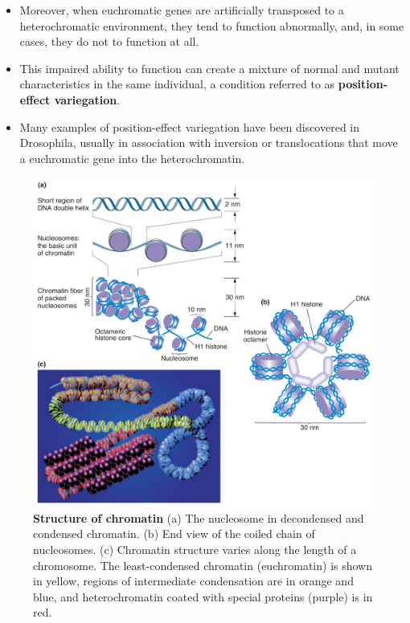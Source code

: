 \documentclass[11pt,dvipsnames,ignorenonframetext,aspectratio=169]{beamer}
\providecommand{\tightlist}{%
  \setlength{\itemsep}{0pt}\setlength{\parskip}{0pt}}
\begin{document}
\begin{frame}{}
\protect\hypertarget{section-6}{}
\begin{itemize}
\tightlist
\item
  Moreover, when euchromatic genes are artificially transposed to a
  heterochromatic environment, they tend to function abnormally, and, in
  some cases, they do not to function at all.
\item
  This impaired ability to function can create a mixture of normal and
  mutant characteristics in the same individual, a condition referred to
  as \textbf{position-effect variegation}.
\item
  Many examples of position-effect variegation have been discovered in
  Drosophila, usually in association with inversion or translocations
  that move a euchromatic gene into the heterochromatin.
\end{itemize}
\end{frame}

\begin{frame}{}
\protect\hypertarget{section-7}{}
\begin{figure}

{\centering \includegraphics[width=0.45\linewidth]{../images/structure_of_chromatin} 

}

\caption{\textbf{Structure of chromatin} \newline (a) The nucleosome in decondensed and condensed chromatin. (b) End view of the coiled chain of nucleosomes. (c) Chromatin structure varies along the length of a chromosome. The least-condensed chromatin (euchromatin) is shown in yellow, regions of intermediate condensation are in orange and blue, and heterochromatin coated with special proteins (purple) is in red.}\label{fig:structure-of-chromatin}
\end{figure}
\end{frame}
\end{document}

